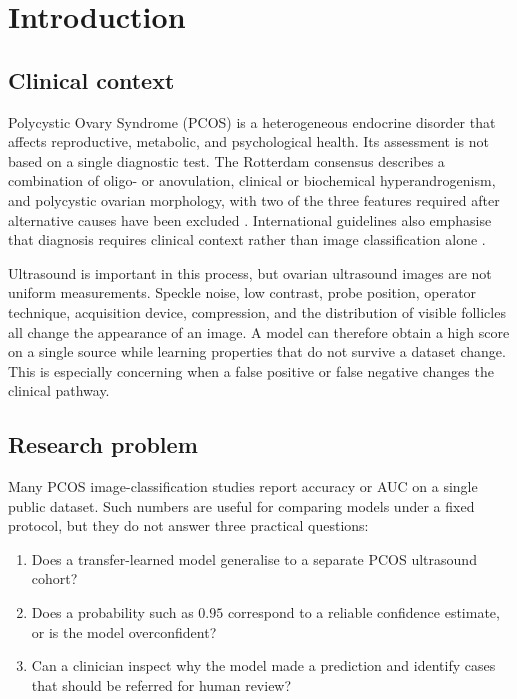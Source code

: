 \documentclass[../preamble.tex]{subfiles}
\begin{document}
\chapter{Introduction}
\label{ch:introduction}

\section{Clinical context}
\label{sec:intro-context}

Polycystic Ovary Syndrome (PCOS) is a heterogeneous endocrine disorder that
affects reproductive, metabolic, and psychological health. Its assessment is
not based on a single diagnostic test. The Rotterdam consensus describes a
combination of oligo- or anovulation, clinical or biochemical
hyperandrogenism, and polycystic ovarian morphology, with two of the three
features required after alternative causes have been excluded
\cite{rotterdam2003}. International guidelines also emphasise that diagnosis
requires clinical context rather than image classification alone
\cite{teede2018}.

Ultrasound is important in this process, but ovarian ultrasound images are
not uniform measurements. Speckle noise, low contrast, probe position,
operator technique, acquisition device, compression, and the distribution of
visible follicles all change the appearance of an image. A model can therefore
obtain a high score on a single source while learning properties that do not
survive a dataset change. This is especially concerning when a false positive
or false negative changes the clinical pathway.

\section{Research problem}
\label{sec:intro-problem}

Many PCOS image-classification studies report accuracy or AUC on a single
public dataset. Such numbers are useful for comparing models under a fixed
protocol, but they do not answer three practical questions:

\begin{enumerate}
  \item Does a transfer-learned model generalise to a separate PCOS ultrasound
        cohort?
  \item Does a probability such as $0.95$ correspond to a reliable confidence
        estimate, or is the model overconfident?
  \item Can a clinician inspect why the model made a prediction and identify
        cases that should be referred for human review?
\end{enumerate}
\end{document}
